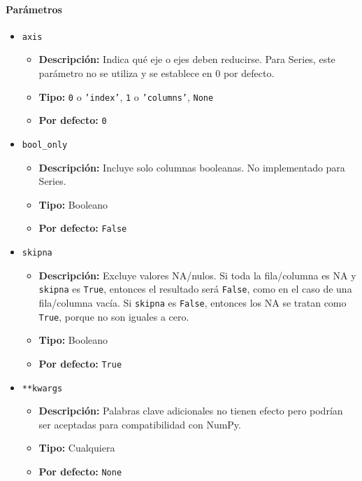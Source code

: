         \paragraph{\textbf{Parámetros}}
        \begin{itemize}
            \item \texttt{axis}
                \begin{itemize}
                    \item \textbf{Descripción:} Indica qué eje o ejes deben reducirse. Para Series, este parámetro no se utiliza y se establece en 0 por defecto.
                    \item \textbf{Tipo:} \texttt{0} o \texttt{'index'}, \texttt{1} o \texttt{'columns'}, \texttt{None}
                    \item \textbf{Por defecto:} \texttt{0}
                \end{itemize}
            \item \texttt{bool\_only}
                \begin{itemize}
                    \item \textbf{Descripción:} Incluye solo columnas booleanas. No implementado para Series.
                    \item \textbf{Tipo:} Booleano
                    \item \textbf{Por defecto:} \texttt{False}
                \end{itemize}
            \item \texttt{skipna}
                \begin{itemize}
                    \item \textbf{Descripción:} Excluye valores NA/nulos. Si toda la fila/columna es NA y \texttt{skipna} es \texttt{True}, entonces el resultado será \texttt{False}, como en el caso de una fila/columna vacía. Si \texttt{skipna} es \texttt{False}, entonces los NA se tratan como \texttt{True}, porque no son iguales a cero.
                    \item \textbf{Tipo:} Booleano
                    \item \textbf{Por defecto:} \texttt{True}
                \end{itemize}
            \item \texttt{**kwargs}
                \begin{itemize}
                    \item \textbf{Descripción:} Palabras clave adicionales no tienen efecto pero podrían ser aceptadas para compatibilidad con NumPy.
                    \item \textbf{Tipo:} Cualquiera
                    \item \textbf{Por defecto:} \texttt{None}
                \end{itemize}
        \end{itemize}


